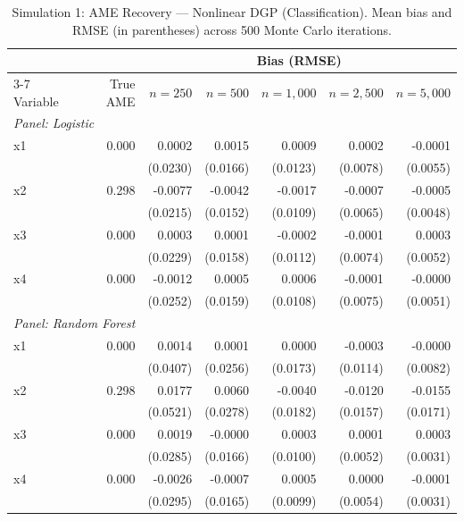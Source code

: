 \documentclass[12pt,a4paper]{article}
\numberwithin{equation}{section}
\theoremstyle{plain}
\theoremstyle{definition}
\begin{document}
	\begin{table}[htbp]
		\centering
		\small
		\begin{threeparttable}
			\caption{Simulation 1: AME Recovery --- Nonlinear DGP (Classification). Mean bias and RMSE (in parentheses) across 500 Monte Carlo iterations.}
			\label{tab:sim1_classification_nonlinear}
			\begin{tabular}{lrrrrrr}
				\toprule
				& & \multicolumn{5}{c}{Bias (RMSE)} \\
				\cmidrule(lr){3-7}
				Variable & True AME & $n=250$ & $n=500$ & $n=1,000$ & $n=2,500$ & $n=5,000$ \\
				\midrule
				\multicolumn{7}{l}{\textit{Panel: Logistic}} \\
				\quad x1 & 0.000 & 0.0002 & 0.0015 & 0.0009 & 0.0002 & -0.0001 \\
				&  & (0.0230) & (0.0166) & (0.0123) & (0.0078) & (0.0055) \\
				\quad x2 & 0.298 & -0.0077 & -0.0042 & -0.0017 & -0.0007 & -0.0005 \\
				&  & (0.0215) & (0.0152) & (0.0109) & (0.0065) & (0.0048) \\
				\quad x3 & 0.000 & 0.0003 & 0.0001 & -0.0002 & -0.0001 & 0.0003 \\
				&  & (0.0229) & (0.0158) & (0.0112) & (0.0074) & (0.0052) \\
				\quad x4 & 0.000 & -0.0012 & 0.0005 & 0.0006 & -0.0001 & -0.0000 \\
				&  & (0.0252) & (0.0159) & (0.0108) & (0.0075) & (0.0051) \\
				\midrule
				\multicolumn{7}{l}{\textit{Panel: Random Forest}} \\
				\quad x1 & 0.000 & 0.0014 & 0.0001 & 0.0000 & -0.0003 & -0.0000 \\
				&  & (0.0407) & (0.0256) & (0.0173) & (0.0114) & (0.0082) \\
				\quad x2 & 0.298 & 0.0177 & 0.0060 & -0.0040 & -0.0120 & -0.0155 \\
				&  & (0.0521) & (0.0278) & (0.0182) & (0.0157) & (0.0171) \\
				\quad x3 & 0.000 & 0.0019 & -0.0000 & 0.0003 & 0.0001 & 0.0003 \\
				&  & (0.0285) & (0.0166) & (0.0100) & (0.0052) & (0.0031) \\
				\quad x4 & 0.000 & -0.0026 & -0.0007 & 0.0005 & 0.0000 & -0.0001 \\
				&  & (0.0295) & (0.0165) & (0.0099) & (0.0054) & (0.0031) \\
				\midrule

\end{tabular}
\end{threeparttable}
\end{table}
\end{document}

